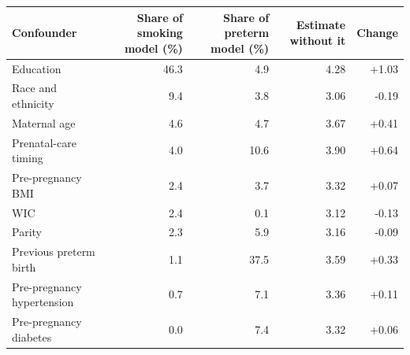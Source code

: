 {\small
\begin{tabular}{lrrrr}
\toprule
Confounder & Share of smoking model (\%) & Share of preterm model (\%) & Estimate without it & Change \\
\midrule
Education & 46.3 & 4.9 & 4.28 & +1.03 \\
Race and ethnicity & 9.4 & 3.8 & 3.06 & -0.19 \\
Maternal age & 4.6 & 4.7 & 3.67 & +0.41 \\
Prenatal-care timing & 4.0 & 10.6 & 3.90 & +0.64 \\
Pre-pregnancy BMI & 2.4 & 3.7 & 3.32 & +0.07 \\
WIC & 2.4 & 0.1 & 3.12 & -0.13 \\
Parity & 2.3 & 5.9 & 3.16 & -0.09 \\
Previous preterm birth & 1.1 & 37.5 & 3.59 & +0.33 \\
Pre-pregnancy hypertension & 0.7 & 7.1 & 3.36 & +0.11 \\
Pre-pregnancy diabetes & 0.0 & 7.4 & 3.32 & +0.06 \\
\bottomrule
\end{tabular}
}
